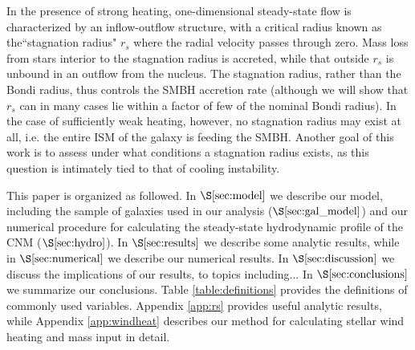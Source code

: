 \documentclass[usenatbib,fleqn]{mn2e}
\newcommand{\rs}{r_s}
\begin{document}
In the presence of strong heating, one-dimensional steady-state flow
is characterized by an inflow-outflow structure, with a critical
radius known as the``stagnation radius" $\rs$ where the radial
velocity passes through zero.  Mass loss from stars interior to the
stagnation radius is accreted, while that outside $\rs$ is unbound in
an outflow from the nucleus.  The stagnation radius, rather than the
Bondi radius, thus controls the SMBH accretion rate (although we will
show that $\rs$ can in many cases lie within a factor of few of the
nominal Bondi radius).  In the case of sufficiently weak heating,
however, no stagnation radius may exist at all, i.e. the entire ISM of
the galaxy is feeding the SMBH.  Another goal of this work is to
assess under what conditions a stagnation radius exists, as this
question is intimately tied to that of cooling instability.


This paper is organized as followed.  In $\S\ref{sec:model}$ we
describe our model, including the sample of galaxies used in our
analysis ($\S\ref{sec:gal_model}$) and our numerical procedure for
calculating the steady-state hydrodynamic profile of the CNM
($\S\ref{sec:hydro}$).  In $\S\ref{sec:results}$ we describe some
analytic results, while in $\S\ref{sec:numerical}$ we describe our numerical results.  In $\S\ref{sec:discussion}$ we discuss the implications of our results, to topics including...   In $\S\ref{sec:conclusions}$ we summarize our conclusions.  Table \ref{table:definitions} provides the definitions of commonly used variables.  Appendix \ref{app:rs} provides useful analytic results, while Appendix \ref{app:windheat} describes our method for calculating stellar wind heating and mass input in detail.  
\end{document}
